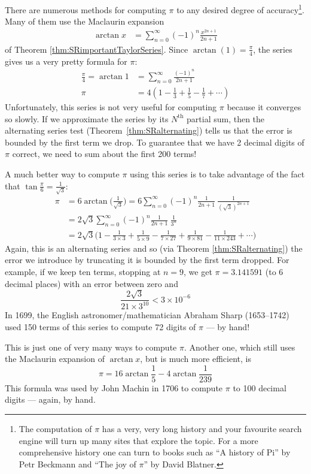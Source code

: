 \begin{eg}\label{eg:pi}
There are numerous methods for computing $\pi$ to any desired degree
of accuracy\footnote{The computation of $\pi$ has a very, very long
history and your favourite search engine will turn
up many sites that explore the topic. For a more comprehensive
history one can turn to books such as ``A history of
Pi'' by Petr Beckmann and ``The joy of $\pi$'' by David Blatner.}. Many
of them use the Maclaurin expansion
\begin{align*}
\arctan x &= \sum_{n=0}^\infty (-1)^n\frac{x^{2n+1}}{2n+1}
\end{align*}
of Theorem \ref{thm:SRimportantTaylorSeries}.
Since $\arctan(1)=\frac{\pi}{4}$, the series gives us a very pretty
formula for $\pi$:
\begin{align*}
\frac{\pi}{4} = \arctan 1 &= \sum_{n=0}^\infty \frac{(-1)^n}{2n+1}\\
 \pi &= 4 \left( 1 - \frac{1}{3} + \frac{1}{5} - \frac{1}{7} + \cdots \right)
\end{align*}
Unfortunately, this series is not very useful for computing $\pi$ because it converges so slowly. If we approximate the
series by its $N^\mathrm{th}$ partial sum, then the alternating series test (Theorem~\ref{thm:SRalternating}) tells us
that the error is bounded by the first term we drop. To guarantee
that we have 2 decimal digits of $\pi$ correct, we need to
sum about the first 200 terms!

A much better way to compute $\pi$ using this series is to take
advantage of the fact that $\tan\frac{\pi}{6}=\frac{1}{\sqrt{3}}$:
\begin{align*}
\pi&= 6\arctan\Big(\frac{1}{\sqrt{3}}\Big)
= 6\sum_{n=0}^\infty (-1)^n\frac{1}{2n+1}\ \frac{1}{{(\sqrt{3})}^{2n+1}} \\
&= 2\sqrt{3} \sum_{n=0}^\infty (-1)^n\frac{1}{2n+1}\ \frac{1}{3^n} \\
&=2\sqrt{3}\Big(1-\frac{1}{3\times 3}+\frac{1}{5\times 9}-\frac{1}{7\times 27}
+\frac{1}{9\times 81}-\frac{1}{11\times 243}+\cdots\Big)
\end{align*}
Again, this is an alternating series and so (via Theorem \ref{thm:SRalternating}) the error we introduce by
truncating it is bounded by the first term dropped. For example,
if we keep ten terms, stopping at $n=9$, we get $\pi=3.141591$
(to 6 decimal places) with an error between zero and
\begin{equation*}
\frac{2\sqrt{3}}{21\times 3^{10}}<3\times 10^{-6}
\end{equation*}
In 1699, the English astronomer/mathematician
Abraham Sharp (1653--1742) used 150 terms of this series to compute 72 digits of $\pi$ --- by hand!

This is just one of very many ways to compute $\pi$. Another one, which still uses the Maclaurin expansion of $\arctan x$, but is much
more efficient, is
\begin{equation*}
\pi= 16\arctan\frac{1}{5}-4\arctan\frac{1}{239}
\end{equation*}
This formula was used by John Machin in 1706 to compute $\pi$ to 100 decimal digits --- again, by hand.
\end{eg}



